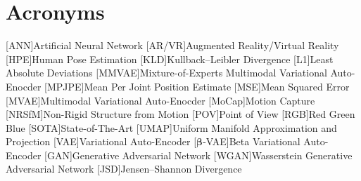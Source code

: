 \chapter*{Acronyms}

\begin{acronym}[TBD]
    [ANN]{Artificial Neural Network}
    [AR/VR]{Augmented Reality/Virtual Reality}
    [HPE]{Human Pose Estimation}
    [KLD]{Kullback–Leibler Divergence}
    [L1]{Least Absolute Deviations}
    [MMVAE]{Mixture-of-Experts Multimodal Variational Auto-Enocder}
    [MPJPE]{Mean Per Joint Position Estimate}
    [MSE]{Mean Squared Error}
    [MVAE]{Multimodal Variational Auto-Enocder}
    [MoCap]{Motion Capture}
    [NRSfM]{Non-Rigid Structure from Motion}
    [POV]{Point of View}
    [RGB]{Red Green Blue}
    [SOTA]{State-of-The-Art}
    [UMAP]{Uniform Manifold Approximation and Projection}
    [VAE]{Variational Auto-Encoder}
    [$\boldsymbol{\beta}$-VAE]{Beta Variational Auto-Encoder}
    [GAN]{Generative Adversarial Network}
    [WGAN]{Wasserstein Generative Adversarial Network}
    [JSD]{Jensen–Shannon Divergence}
\end{acronym}

